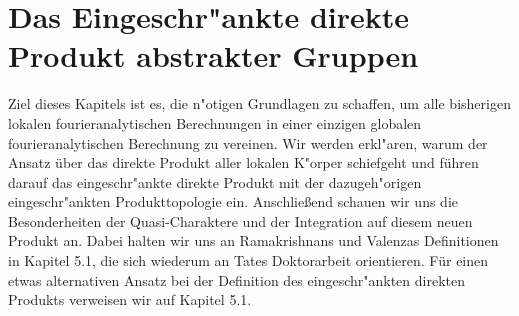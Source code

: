 \section{Das Eingeschr"ankte direkte Produkt abstrakter Gruppen}\label{sec:rdp}
	Ziel dieses Kapitels ist es, die n"otigen Grundlagen zu schaffen, um alle bisherigen lokalen fourieranalytischen Berechnungen in einer einzigen globalen fourieranalytischen Berechnung zu vereinen. 
	Wir werden erkl"aren, warum der Ansatz über das direkte Produkt aller lokalen K"orper schiefgeht und führen darauf das eingeschr"ankte direkte Produkt mit der dazugeh"origen eingeschr"ankten Produkttopologie ein.
	Anschließend schauen wir uns die Besonderheiten der Quasi-Charaktere und der Integration auf diesem neuen Produkt an. 
	Dabei halten wir uns an Ramakrishnans und Valenzas Definitionen in \cite{rama} Kapitel 5.1, die sich wiederum an Tates Doktorarbeit \cite{tate} orientieren.
	Für einen etwas alternativen Ansatz bei der Definition des eingeschr"ankten direkten Produkts verweisen wir auf \textcite{deitmar2010} Kapitel 5.1.
